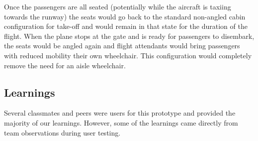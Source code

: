 Once the passengers are all seated (potentially while the aircraft is taxiing towards the runway) the seats would go back to the standard non-angled cabin configuration for take-off and would remain in that state for the duration of the flight. When the plane stops at the gate and is ready for passengers to disembark, the seats would be angled again and flight attendants would bring passengers with reduced mobility their own wheelchair. This configuration would completely remove the need for an aisle wheelchair.\\ 






\subsection{Learnings}
Several classmates and peers were users for this prototype and provided the majority of our learnings.  However, some of the learnings came directly from team observations during user testing. 

\newpage

